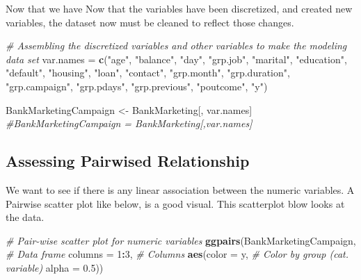 \documentclass[
]{article}
\newenvironment{Shaded}{\begin{snugshade}}{\end{snugshade}}
\newcommand{\AttributeTok}[1]{\textcolor[rgb]{0.13,0.29,0.53}{#1}}
\newcommand{\CommentTok}[1]{\textcolor[rgb]{0.56,0.35,0.01}{\textit{#1}}}
\newcommand{\DecValTok}[1]{\textcolor[rgb]{0.00,0.00,0.81}{#1}}
\newcommand{\FloatTok}[1]{\textcolor[rgb]{0.00,0.00,0.81}{#1}}
\newcommand{\FunctionTok}[1]{\textcolor[rgb]{0.13,0.29,0.53}{\textbf{#1}}}
\newcommand{\NormalTok}[1]{#1}
\newcommand{\OtherTok}[1]{\textcolor[rgb]{0.56,0.35,0.01}{#1}}
\newcommand{\SpecialCharTok}[1]{\textcolor[rgb]{0.81,0.36,0.00}{\textbf{#1}}}
\newcommand{\StringTok}[1]{\textcolor[rgb]{0.31,0.60,0.02}{#1}}
\begin{document}
Now that we have Now that the variables have been discretized, and
created new variables, the dataset now must be cleaned to reflect those
changes.

\begin{Shaded}
\begin{Highlighting}[]
\CommentTok{\# Assembling the discretized variables and other variables to make the modeling data set}
\NormalTok{var.names }\OtherTok{=} \FunctionTok{c}\NormalTok{(}\StringTok{"age"}\NormalTok{, }\StringTok{"balance"}\NormalTok{, }\StringTok{"day"}\NormalTok{, }\StringTok{"grp.job"}\NormalTok{, }\StringTok{"marital"}\NormalTok{, }\StringTok{"education"}\NormalTok{, }\StringTok{"default"}\NormalTok{, }\StringTok{"housing"}\NormalTok{, }\StringTok{"loan"}\NormalTok{, }\StringTok{"contact"}\NormalTok{, }\StringTok{"grp.month"}\NormalTok{, }\StringTok{"grp.duration"}\NormalTok{, }\StringTok{"grp.campaign"}\NormalTok{, }\StringTok{"grp.pdays"}\NormalTok{, }\StringTok{"grp.previous"}\NormalTok{, }\StringTok{"poutcome"}\NormalTok{, }\StringTok{"y"}\NormalTok{) }

\NormalTok{BankMarketingCampaign }\OtherTok{\textless{}{-}}\NormalTok{ BankMarketing[, var.names]}
\CommentTok{\#BankMarketingCampaign = BankMarketing[,var.names]}
\end{Highlighting}
\end{Shaded}

\subsection{Assessing Pairwised
Relationship}\label{assessing-pairwised-relationship}

We want to see if there is any linear association between the numeric
variables. A Pairwise scatter plot like below, is a good visual. This
scatterplot blow looks at the data.

\begin{Shaded}
\begin{Highlighting}[]
\CommentTok{\# Pair{-}wise scatter plot for numeric variables}
\FunctionTok{ggpairs}\NormalTok{(BankMarketingCampaign,  }\CommentTok{\# Data frame}
        \AttributeTok{columns =} \DecValTok{1}\SpecialCharTok{:}\DecValTok{3}\NormalTok{,  }\CommentTok{\# Columns}
        \FunctionTok{aes}\NormalTok{(}\AttributeTok{color =}\NormalTok{ y,  }\CommentTok{\# Color by group (cat. variable)}
            \AttributeTok{alpha =} \FloatTok{0.5}\NormalTok{))}
\end{Highlighting}
\end{Shaded}
\end{document}
